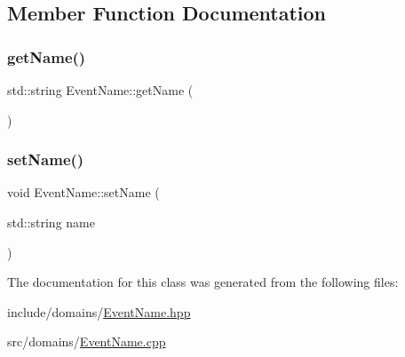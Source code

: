 \subsection{Member Function Documentation}
\mbox{\label{class_event_name_a6ffddc64722014b6d4fdc9d0b5c4c0f2}} 
\subsubsection{\texorpdfstring{getName()}{getName()}}
{\footnotesize\ttfamily std\+::string Event\+Name\+::get\+Name (\begin{DoxyParamCaption}{ }\end{DoxyParamCaption})}

\mbox{\label{class_event_name_a56c6c083913f99731f27a2becfd43672}} 
\subsubsection{\texorpdfstring{setName()}{setName()}}
{\footnotesize\ttfamily void Event\+Name\+::set\+Name (\begin{DoxyParamCaption}\item[{std\+::string}]{name }\end{DoxyParamCaption})}



The documentation for this class was generated from the following files\+:\begin{DoxyCompactItemize}
\item 
include/domains/\mbox{\hyperlink{_event_name_8hpp}{Event\+Name.\+hpp}}\item 
src/domains/\mbox{\hyperlink{_event_name_8cpp}{Event\+Name.\+cpp}}\end{DoxyCompactItemize}
